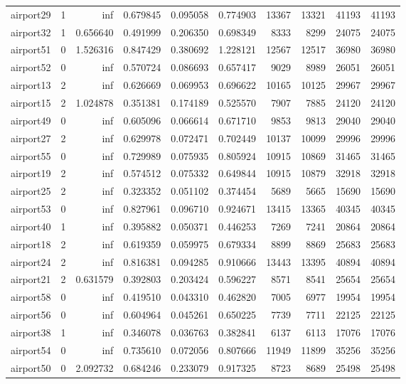 \begin{longtable}{|l|r|r|r|r|r|r|r|r|r|}
airport29 & 1 & inf & 0.679845 & 0.095058 & 0.774903 & 13367 & 13321 & 41193 & 41193 \\
airport32 & 1 & 0.656640 & 0.491999 & 0.206350 & 0.698349 & 8333 & 8299 & 24075 & 24075 \\
airport51 & 0 & 1.526316 & 0.847429 & 0.380692 & 1.228121 & 12567 & 12517 & 36980 & 36980 \\
airport52 & 0 & inf & 0.570724 & 0.086693 & 0.657417 & 9029 & 8989 & 26051 & 26051 \\
airport13 & 2 & inf & 0.626669 & 0.069953 & 0.696622 & 10165 & 10125 & 29967 & 29967 \\
airport15 & 2 & 1.024878 & 0.351381 & 0.174189 & 0.525570 & 7907 & 7885 & 24120 & 24120 \\
airport49 & 0 & inf & 0.605096 & 0.066614 & 0.671710 & 9853 & 9813 & 29040 & 29040 \\
airport27 & 2 & inf & 0.629978 & 0.072471 & 0.702449 & 10137 & 10099 & 29996 & 29996 \\
airport55 & 0 & inf & 0.729989 & 0.075935 & 0.805924 & 10915 & 10869 & 31465 & 31465 \\
airport19 & 2 & inf & 0.574512 & 0.075332 & 0.649844 & 10915 & 10879 & 32918 & 32918 \\
airport25 & 2 & inf & 0.323352 & 0.051102 & 0.374454 & 5689 & 5665 & 15690 & 15690 \\
airport53 & 0 & inf & 0.827961 & 0.096710 & 0.924671 & 13415 & 13365 & 40345 & 40345 \\
airport40 & 1 & inf & 0.395882 & 0.050371 & 0.446253 & 7269 & 7241 & 20864 & 20864 \\
airport18 & 2 & inf & 0.619359 & 0.059975 & 0.679334 & 8899 & 8869 & 25683 & 25683 \\
airport24 & 2 & inf & 0.816381 & 0.094285 & 0.910666 & 13443 & 13395 & 40894 & 40894 \\
airport21 & 2 & 0.631579 & 0.392803 & 0.203424 & 0.596227 & 8571 & 8541 & 25654 & 25654 \\
airport58 & 0 & inf & 0.419510 & 0.043310 & 0.462820 & 7005 & 6977 & 19954 & 19954 \\
airport56 & 0 & inf & 0.604964 & 0.045261 & 0.650225 & 7739 & 7711 & 22125 & 22125 \\
airport38 & 1 & inf & 0.346078 & 0.036763 & 0.382841 & 6137 & 6113 & 17076 & 17076 \\
airport54 & 0 & inf & 0.735610 & 0.072056 & 0.807666 & 11949 & 11899 & 35256 & 35256 \\
airport50 & 0 & 2.092732 & 0.684246 & 0.233079 & 0.917325 & 8723 & 8689 & 25498 & 25498 \\

\end{longtable}
